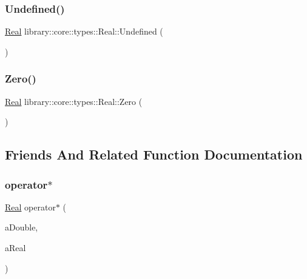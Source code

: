 \mbox{\label{classlibrary_1_1core_1_1types_1_1_real_a67778e3d4c5a5b6ca6ddcd47964b9a79}} 
\subsubsection{\texorpdfstring{Undefined()}{Undefined()}}
{\footnotesize\ttfamily \mbox{\hyperlink{classlibrary_1_1core_1_1types_1_1_real}{Real}} library\+::core\+::types\+::\+Real\+::\+Undefined (\begin{DoxyParamCaption}{ }\end{DoxyParamCaption})\hspace{0.3cm}{\ttfamily [static]}}

\mbox{\label{classlibrary_1_1core_1_1types_1_1_real_a35434e6329366cb571efbd9c4ead6501}} 
\subsubsection{\texorpdfstring{Zero()}{Zero()}}
{\footnotesize\ttfamily \mbox{\hyperlink{classlibrary_1_1core_1_1types_1_1_real}{Real}} library\+::core\+::types\+::\+Real\+::\+Zero (\begin{DoxyParamCaption}{ }\end{DoxyParamCaption})\hspace{0.3cm}{\ttfamily [static]}}



\subsection{Friends And Related Function Documentation}
\mbox{\label{classlibrary_1_1core_1_1types_1_1_real_a7ca23417eb394573dad57b0e763b3e47}} 
\subsubsection{\texorpdfstring{operator$\ast$}{operator*}}
{\footnotesize\ttfamily \mbox{\hyperlink{classlibrary_1_1core_1_1types_1_1_real}{Real}} operator$\ast$ (\begin{DoxyParamCaption}\item[{const \mbox{\hyperlink{classlibrary_1_1core_1_1types_1_1_real_a9c5c8826b7e5a8e39544d23fea6c0e1c}{Real\+::\+Value\+Type}} \&}]{a\+Double,  }\item[{const \mbox{\hyperlink{classlibrary_1_1core_1_1types_1_1_real}{Real}} \&}]{a\+Real }\end{DoxyParamCaption})\hspace{0.3cm}{\ttfamily [friend]}}

